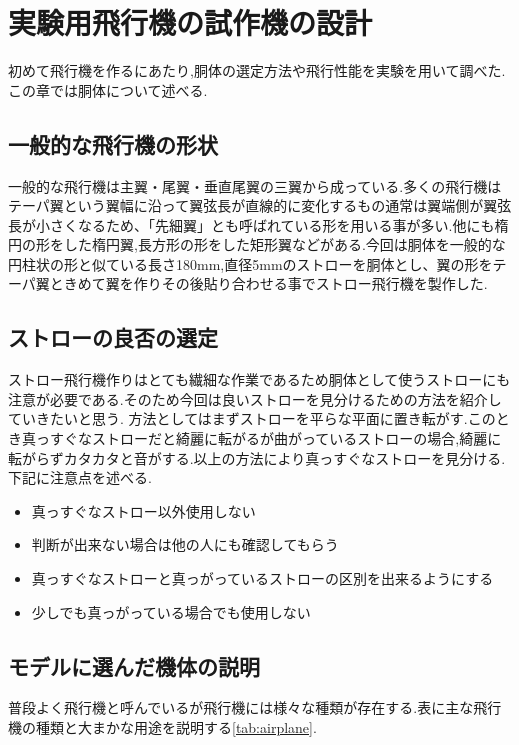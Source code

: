 
\chapter{実験用飛行機の試作機の設計}
初めて飛行機を作るにあたり,胴体の選定方法や飛行性能を実験を用いて調べた.この章では胴体について述べる.

\section{一般的な飛行機の形状}
一般的な飛行機は主翼・尾翼・垂直尾翼の三翼から成っている.多くの飛行機はテーパ翼という翼幅に沿って翼弦長が直線的に変化するもの通常は翼端側が翼弦長が小さくなるため、「先細翼」とも呼ばれている形を用いる事が多い.他にも楕円の形をした楕円翼,長方形の形をした矩形翼などがある.今回は胴体を一般的な円柱状の形と似ている長さ180mm,直径5mmのストローを胴体とし、翼の形をテーパ翼ときめて翼を作りその後貼り合わせる事でストロー飛行機を製作した.

\section{ストローの良否の選定}
ストロー飛行機作りはとても繊細な作業であるため胴体として使うストローにも注意が必要である.そのため今回は良いストローを見分けるための方法を紹介していきたいと思う.
方法としてはまずストローを平らな平面に置き転がす.このとき真っすぐなストローだと綺麗に転がるが曲がっているストローの場合,綺麗に転がらずカタカタと音がする.以上の方法により真っすぐなストローを見分ける.下記に注意点を述べる.
\begin{itemize}
\item 真っすぐなストロー以外使用しない

\item 判断が出来ない場合は他の人にも確認してもらう

\item 真っすぐなストローと真っがっているストローの区別を出来るようにする

\item 少しでも真っがっている場合でも使用しない

\end{itemize}

\section{モデルに選んだ機体の説明}
普段よく飛行機と呼んでいるが飛行機には様々な種類が存在する.表に主な飛行機の種類と大まかな用途を説明する\ref{tab:airplane}.

